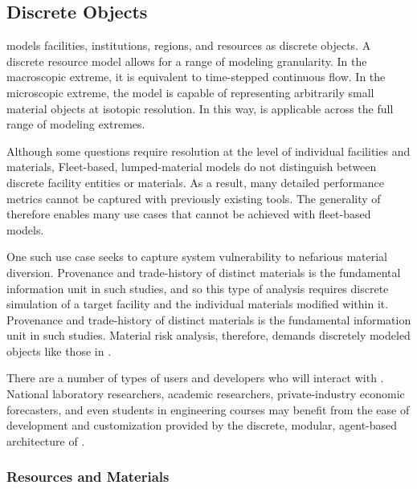 \subsection{Discrete Objects}

\Cyclus models facilities, institutions, regions, and resources as discrete 
objects. A discrete resource model allows for a range of modeling granularity. In the
macroscopic extreme, it is equivalent to time-stepped continuous flow. In the
microscopic extreme, the model is capable of representing arbitrarily small 
material objects at isotopic resolution. In this way, \Cyclus is 
applicable across the full range of modeling extremes. 

Although some questions require resolution at the level of 
individual facilities and materials, 
Fleet-based, lumped-material models do not distinguish between discrete
facility entities or materials.  As a result, many detailed performance 
metrics cannot be captured with previously existing tools.
The generality of \Cyclus therefore enables many use cases 
that cannot be achieved with fleet-based models. 

One such use case seeks to capture system vulnerability to nefarious 
material diversion. Provenance and trade-history of distinct materials is the fundamental 
information unit in such studies, and so this type of analysis requires
 discrete simulation of a 
target facility and the individual materials modified within it. 
Provenance and trade-history of distinct materials is the fundamental 
information unit in such studies. 
Material risk analysis, therefore, demands discretely modeled objects like those 
in \Cyclus.

There are a number of types of users and developers who will 
interact with \Cyclus. National laboratory researchers,
academic researchers, private-industry economic forecasters, and even students 
in engineering courses may benefit from the ease of development and
customization provided by the discrete, modular, agent-based architecture of \Cyclus.


\subsubsection{Resources and Materials}

